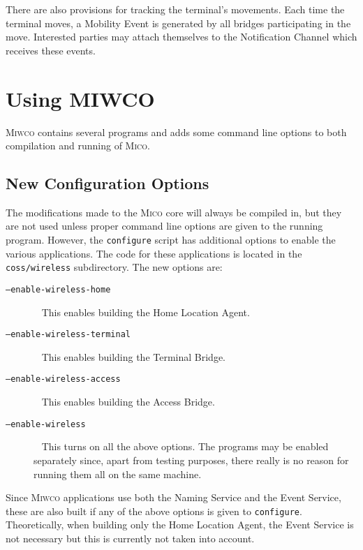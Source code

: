 \documentclass[12pt,a4paper,draft]{article}
\newcommand{\MICO}{\textsc{Mico}}
\newcommand{\MIWCO}{\textsc{Miwco}}
\begin{document}
There are also provisions for tracking the terminal's movements.  Each
time the terminal moves, a Mobility Event is generated by all bridges
participating in the move.  Interested parties may attach themselves
to the Notification Channel which receives these events.

\section{Using MIWCO}

\MIWCO{} contains several programs and adds some command line options
to both compilation and running of \MICO{}.

\subsection{New Configuration Options}

The modifications made to the \MICO{} core will always be compiled in,
but they are not used unless proper command line options are given to
the running program.  However, the \texttt{configure} script has
additional options to enable the various applications.  The code for
these applications is located in the \texttt{coss/wireless}
subdirectory.  The new options are:

\begin{description}
\item[\texttt{--enable-wireless-home}] 
  ~\newline
  This enables building the Home Location Agent.
\item[\texttt{--enable-wireless-terminal}] 
  ~\newline
  This enables building the Terminal Bridge.
\item[\texttt{--enable-wireless-access}] 
  ~\newline
  This enables building the Access Bridge.
\item[\texttt{--enable-wireless}] 
  ~\newline
  This turns on all the above options.  The programs may be enabled
  separately since, apart from testing purposes, there really is no
  reason for running them all on the same machine.
\end{description}

Since \MIWCO{} applications use both the Naming Service and the Event
Service, these are also built if any of the above options is given to
\texttt{configure}.  Theoretically, when building only the Home
Location Agent, the Event Service is not necessary but this is
currently not taken into account.
\end{document}
